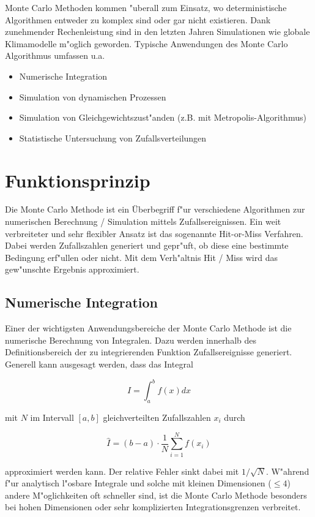 \begin{refsection}
Monte Carlo Methoden kommen "uberall zum Einsatz, wo deterministische
Algorithmen entweder zu komplex sind oder gar nicht existieren. Dank
zunehmender Rechenleistung sind in den letzten Jahren Simulationen wie
globale Klimamodelle m"oglich geworden. Typische Anwendungen des Monte
Carlo Algorithmus umfassen u.a.

\begin{itemize}
\item Numerische Integration
\item Simulation von dynamischen Prozessen
\item Simulation von Gleichgewichtszust"anden (z.B. mit Metropolis-Algorithmus)
\item Statistische Untersuchung von Zufallsverteilungen
\end{itemize}

\section{Funktionsprinzip}
Die Monte Carlo Methode ist ein Überbegriff f"ur verschiedene Algorithmen
zur numerischen Berechnung / Simulation mittels Zufallsereignissen. Ein
weit verbreiteter und sehr flexibler Ansatz ist das sogenannte Hit-or-Miss
Verfahren. Dabei werden Zufallszahlen generiert und gepr"uft, ob diese
eine bestimmte Bedingung erf"ullen oder nicht. Mit dem Verh"altnis Hit /
Miss wird das gew"unschte Ergebnis approximiert.

\subsection{Numerische Integration} \label{subsec:numIntegration}
Einer der wichtigsten Anwendungsbereiche der Monte Carlo Methode ist
die numerische Berechnung von Integralen. Dazu werden innerhalb des
Definitionsbereich der zu integrierenden Funktion Zufallsereignisse
generiert. Generell kann ausgesagt werden, dass das Integral

\begin{equation}
	I = \int_a^b f(x) dx
\end{equation} 

mit $N$ im Intervall $[a,b]$ gleichverteilten Zufallszahlen $x_i$ durch

\begin{equation}
	\hat{I} = (b-a) \cdot \frac{1}{N} \sum_{i=1}^{N} f(x_i)
\end{equation}

approximiert werden kann. Der relative Fehler sinkt dabei mit $1 /
\sqrt{N}$. W"ahrend f"ur analytisch l"osbare Integrale und solche mit
kleinen Dimensionen ($\leq 4$) andere M"oglichkeiten oft schneller sind,
ist die Monte Carlo Methode besonders bei hohen Dimensionen oder sehr
komplizierten Integrationsgrenzen verbreitet.


\end{refsection}
